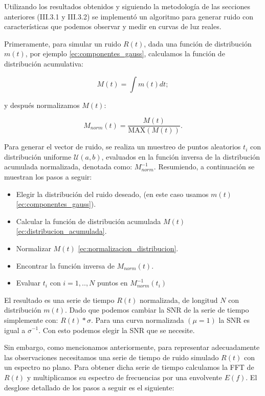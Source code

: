 Utilizando los resultados obtenidos y siguiendo la metodología de las secciones anteriores (III.3.1 y III.3.2) se implementó un algoritmo para generar ruido con características que podemos observar y medir en curvas de luz reales.

Primeramente, para simular un ruido $R(t)$, dada una función de distribución $m(t)$, por ejemplo \ref{ec:componentes_gauss}, calculamos la función de distribución acumulativa:

\begin{equation}\label{ec:distribucion_acumulada}
  \displaystyle M(t)= \int m(t)dt;
\end{equation}

\noindent y después normalizamos $M(t)$:

\begin{equation}\label{ec:normalizacion_distribucion}
  \displaystyle M_{norm}(t)= \dfrac{M(t)}{\mbox{MAX}(M(t))}.
\end{equation}

Para generar el vector de ruido, se realiza un muestreo de puntos aleatorios $t_{i}$ con distribución uniforme $\mathcal{U}(a,b)$, evaluados en la función inversa de la distribución acumulada normalizada, denotada como: $M^{-1}_{norm}$. Resumiendo, a continuación se muestran  los pasos a seguir:\\

\begin{itemize}
  \item Elegir la distribución del ruido deseado, (en este caso usamos $m(t)$ \ref{ec:componentes_gauss}).
  \item Calcular la función de distribución acumulada $M(t)$ \ref{ec:distribucion_acumulada}.
  \item Normalizar $M(t)$ \ref{ec:normalizacion_distribucion}.
  \item Encontrar la función inversa de $M_{norm}(t)$.
  \item Evaluar $t_{i}$ con $i=1,..,N$ puntos en $M^{-1}_{norm}(t_{i})$
\end{itemize}


El resultado es una serie de tiempo $R(t)$ normalizada, de longitud $N$ con distribución $m(t)$. Dado que podemos cambiar la SNR de la serie de tiempo simplemente con: $R(t)*\sigma$. Para una curva normalizada $(\mu=1)$ la SNR es igual a $\sigma^{-1}$. Con esto podemos elegir la SNR que se necesite.

Sin embargo, como mencionamos anteriormente, para representar adecuadamente las observaciones necesitamos una serie de tiempo de ruido simulado $R(t)$ con un espectro no plano. Para obtener dicha serie de tiempo calculamos la FFT de $R(t)$ y multiplicamos su espectro de frecuencias por una envolvente $E(f)$. El desglose detallado de los pasos a seguir es el siguiente:

